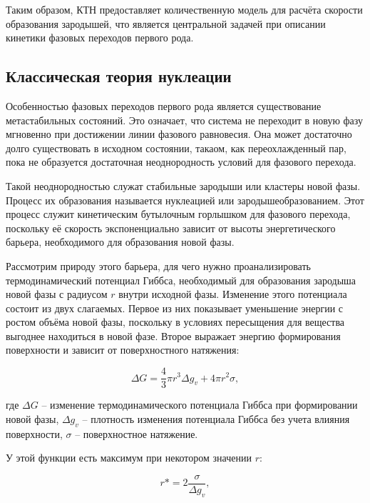 Таким образом, КТН предоставляет количественную модель для расчёта скорости образования зародышей, что является центральной задачей при описании кинетики фазовых переходов первого рода.

\subsection{Классическая теория нуклеации}

Особенностью фазовых переходов первого рода является существование метастабильных состояний. Это означает, что система не переходит в новую фазу мгновенно при достижении линии фазового равновесия. Она может достаточно долго существовать в исходном состоянии, такаом, как переохлажденный пар, пока не образуется достаточная неоднородность условий для фазового перехода. 

Такой неоднородностью служат стабильные зародыши или кластеры новой фазы. Процесс их образования называется нуклеацией или зародышеобразованием. Этот процесс служит кинетическим бутылочным горлышком для фазового перехода, поскольку её скорость экспоненциально зависит от высоты энергетического барьера, необходимого для образования новой фазы.

Рассмотрим природу этого барьера, для чего нужно проанализировать термодинамический потенциал Гиббса, необходимый для образования зародыша новой фазы с радиусом $r$ внутри исходной фазы. Изменение этого потенциала состоит из двух слагаемых. Первое из них показывает уменьшение энергии с ростом объёма новой фазы, поскольку в условиях пересыщения для вещества выгоднее находиться в новой фазе. Второе выражает энергию формирования поверхности и зависит от поверхностного натяжения:

\begin{equation}

\Delta G = \frac{4}{3} \pi r^3 \Delta g_v + 4 \pi r^2 \sigma,

\end{equation}

где $\Delta G$ \--- изменение термодинамического потенциала Гиббса при формировании новой фазы, $\Delta g_v$ \--- плотность изменения потенциала Гиббса без учета влияния поверхности, $\sigma$ \--- поверхностное натяжение. 
 
У этой функции есть максимум при некотором значении $r$:

\begin{equation}

r* = 2\frac{\sigma}{\Delta g_v},

\end{equation}

